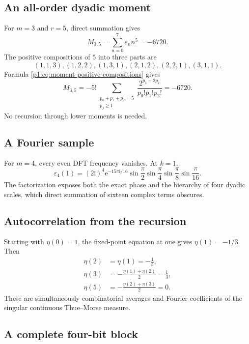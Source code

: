 \documentclass[11pt,oneside]{article}
\numberwithin{equation}{section}
\theoremstyle{definition}
\theoremstyle{remark}
\newcommand{\e}{\mathrm e}
\newcommand{\ii}{\mathrm i}
\newcommand{\eps}{\varepsilon}
\begin{document}
\subsection{An all-order dyadic moment}

For \(m=3\) and \(r=5\), direct summation gives
\begin{equation}
  M_{3,5}=\sum_{n=0}^{7}\eps_nn^5=-6720.
  \label{p1:eq:example-moment-direct}
\end{equation}
The positive compositions of \(5\) into three parts are
\[
 (1,1,3),(1,2,2),(1,3,1),(2,1,2),(2,2,1),(3,1,1).
\]
Formula \eqref{p1:eq:moment-positive-compositions} gives
\begin{equation}
  M_{3,5}
  =-5!\sum_{\substack{p_0+p_1+p_2=5\\p_j\ge1}}
     \frac{2^{p_1+2p_2}}{p_0!p_1!p_2!}
  =-6720.
  \label{p1:eq:example-moment-composition}
\end{equation}
No recursion through lower moments is needed.

\subsection{A Fourier sample}

For \(m=4\), every even DFT frequency vanishes.  At \(k=1\),
\begin{equation}
  \widehat\eps_4(1)
  =(2\ii)^4\e^{-15\pi\ii/16}
  \sin\frac\pi2\sin\frac\pi4
  \sin\frac\pi8\sin\frac\pi{16}.
  \label{p1:eq:example-Fourier}
\end{equation}
The factorization exposes both the exact phase and the hierarchy of four
dyadic scales, which direct summation of sixteen complex terms obscures.

\subsection{Autocorrelation from the recursion}

Starting with \(\eta(0)=1\), the fixed-point equation at one gives
\(\eta(1)=-1/3\).  Then
\begin{align*}
 \eta(2)&=\eta(1)=-\frac13,\\
 \eta(3)&=-\frac{\eta(1)+\eta(2)}2=\frac13,\\
 \eta(5)&=-\frac{\eta(2)+\eta(3)}2=0.
\end{align*}
These are simultaneously combinatorial averages and Fourier coefficients of
the singular continuous Thue--Morse measure.

\subsection{A complete four-bit block}
\end{document}
